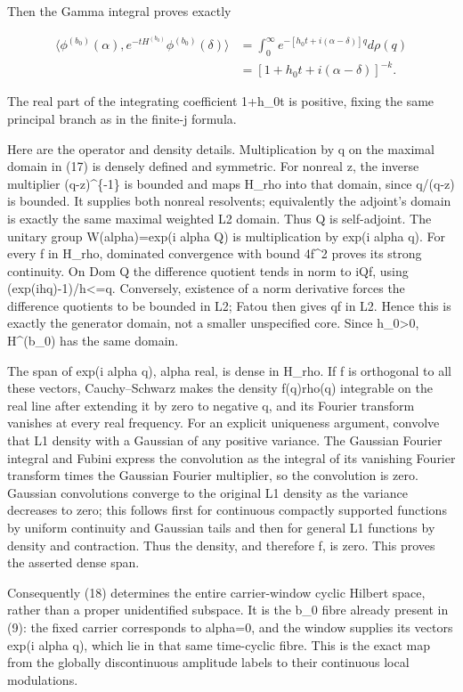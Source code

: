 \documentclass[
  11pt,
]{article}
\begin{document}
Then the Gamma integral proves exactly

\[
 \begin{split}
 \langle\phi^{(b_0)}(\alpha),
             e^{-tH^{(b_0)}}\phi^{(b_0)}(\delta)\rangle
 &=\int_0^\infty e^{-[h_0t+i(\alpha-\delta)]q}d\rho(q)\\
 &=[1+h_0t+i(\alpha-\delta)]^{-k}.
 \end{split}
 \tag{18}
\]

The real part of the integrating coefficient 1+h\_0t is positive, fixing
the same principal branch as in the finite-j formula.

Here are the operator and density details. Multiplication by q on the
maximal domain in (17) is densely defined and symmetric. For nonreal z,
the inverse multiplier (q-z)\^{}\{-1\} is bounded and maps H\_rho into
that domain, since q/(q-z) is bounded. It supplies both nonreal
resolvents; equivalently the adjoint's domain is exactly the same
maximal weighted L2 domain. Thus Q is self-adjoint. The unitary group
W(alpha)=exp(i alpha Q) is multiplication by exp(i alpha q). For every f
in H\_rho, dominated convergence with bound 4\textbar f\textbar\^{}2
proves its strong continuity. On Dom Q the difference quotient tends in
norm to iQf, using \textbar(exp(ihq)-1)/h\textbar\textless=q.
Conversely, existence of a norm derivative forces the difference
quotients to be bounded in L2; Fatou then gives qf in L2. Hence this is
exactly the generator domain, not a smaller unspecified core. Since
h\_0\textgreater0, H\^{}(b\_0) has the same domain.

The span of exp(i alpha q), alpha real, is dense in H\_rho. If f is
orthogonal to all these vectors, Cauchy--Schwarz makes the density
f(q)rho(q) integrable on the real line after extending it by zero to
negative q, and its Fourier transform vanishes at every real frequency.
For an explicit uniqueness argument, convolve that L1 density with a
Gaussian of any positive variance. The Gaussian Fourier integral and
Fubini express the convolution as the integral of its vanishing Fourier
transform times the Gaussian Fourier multiplier, so the convolution is
zero. Gaussian convolutions converge to the original L1 density as the
variance decreases to zero; this follows first for continuous compactly
supported functions by uniform continuity and Gaussian tails and then
for general L1 functions by density and contraction. Thus the density,
and therefore f, is zero. This proves the asserted dense span.

Consequently (18) determines the entire carrier-window cyclic Hilbert
space, rather than a proper unidentified subspace. It is the b\_0 fibre
already present in (9): the fixed carrier corresponds to alpha=0, and
the window supplies its vectors exp(i alpha q), which lie in that same
time-cyclic fibre. This is the exact map from the globally discontinuous
amplitude labels to their continuous local modulations.
\end{document}

